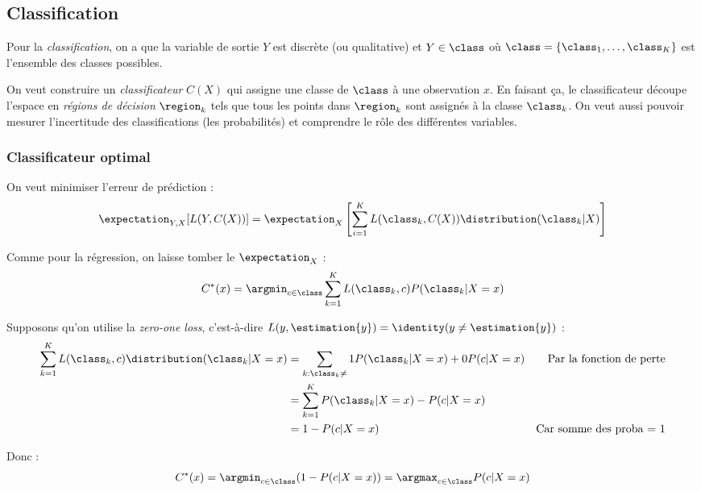 \subsection{Classification}
    \begin{definition}
        Pour la \textit{classification}, on a que la variable de sortie \(Y\) est discrète (ou qualitative) et \(Y \in \class\) où \(\class = \{\class_1, \dots, \class_K\}\) est l'ensemble des classes possibles.

        On veut construire un \textit{classificateur} \(C(X)\) qui assigne une classe de \(\class\) à une observation \(x\). En faisant ça, le classificateur découpe l'espace en \textit{régions de décision} \(\region_k\) tels que tous les points dans \(\region_k\) sont assignés à la classe \(\class_k\). On veut aussi pouvoir mesurer l'incertitude des classifications (les probabilités) et comprendre le rôle des différentes variables.
    \end{definition}
    
    \subsubsection{Classificateur optimal}
        On veut minimiser l'erreur de prédiction :
        \[
            \expectation_{Y,X}[L(Y, C(X))] = \expectation_X\left[\sum_{i=1}^K L(\class_k, C(X))\distribution(\class_k|X)\right]
        \]

        Comme pour la régression, on laisse tomber le \(\expectation_X\) :
        \[
            C^*(x) = \argmin_{c \in \class} \sum_{k=1}^K L(\class_k, c)P(\class_k|X = x)
        \]

        Supposons qu'on utilise la \textit{zero-one loss}, c'est-à-dire \(L(y, \estimation{y}) = \identity(y \not= \estimation{y})\) :
        \begin{align*}
            \sum_{k=1}^K L(\class_k, c)\distribution(\class_k|X = x) &= \sum_{k:\class_k \not=} 1P(\class_k|X = x) + 0P(c | X = x) & \text{Par la fonction de perte}\\
            &= \sum_{k=1}^K P(\class_k | X = x) - P(c | X = x)\\
            &= 1 - P(c | X = x) & \text{Car somme des proba = 1}
        \end{align*}

        Donc :
        \[
            C^*(x) = \argmin_{c\in\class} (1 - P(c | X = x)) = \argmax_{c\in\class} P(c | X = x)
        \]

